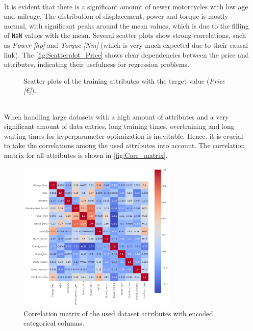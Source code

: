 \\ It is evident that there is a significant amount of newer motorcycles with low age and mileage. The distribution of displacement,
power and torque is mostly normal, with significant peaks around the mean values, which is due to the filling of \texttt{NaN}
values with the mean. Several scatter plots show strong correlations, such as \textit{Power [hp]} and \textit{Torque [Nm]} (which
is very much expected due to their causal link). The \autoref{fig:Scatterplot_Price} shows clear dependencies
between the price and attributes, indicating their usefulness for regression problems.
\begin{figure}
    \centering
        \caption{Scatter plots of the training attributes with the target value (\textit{Price [€]}).}
        \label{fig:Scatterplot_Price}
\end{figure}
\\When handling large datasets with a high amount of attributes and a very significant amount of data entries, long training times, 
overtraining and long waiting times for hyperparameter optimization is inevitable. Hence, it is crucial to take the correlations
among the used attributes into account. The correlation matrix for all attributes is shown in \autoref{fig:Corr_matrix}.
\begin{figure}[!]
    \centering
        \includegraphics[width=0.7\textwidth]{"content/pics/correlation_matrix.png"}
        \caption{Correlation matrix of the used dataset attributes with encoded categorical columns.}
        \label{fig:Corr_matrix}
\end{figure}
